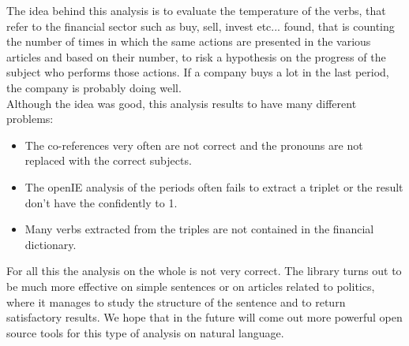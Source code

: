 The idea behind this analysis is to evaluate the temperature of the verbs, that refer to the financial sector such as buy, sell, invest etc... found, that is counting the number of times in which the same actions are presented in the various articles and based on their number, to risk a hypothesis on the progress of the subject who performs those actions. If a company buys a lot in the last period, the company is probably doing well.\\
Although the idea was good, this analysis results to have many different problems:
\begin{itemize}
\item
The co-references very often are not correct and the pronouns are not replaced with the correct subjects.
\item
The openIE analysis of the periods often fails to extract a triplet or the result don't have the confidently to 1.
\item
Many verbs extracted from the triples are not contained in the financial dictionary.
\end{itemize}
For all this the analysis on the whole is not very correct.
The library turns out to be much more effective on simple sentences or on articles related to politics, where it manages to study the structure of the sentence and to return satisfactory results. We hope that in the future will come out more powerful open source tools for this type of analysis on natural language.
